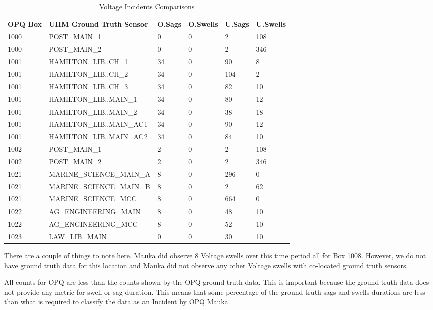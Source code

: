 \begin{table}[H]
    \centering
    \caption{Voltage Incidents Comparisons}
    \begin{tabularx}{\textwidth}{lXllll}
        \toprule
        \textbf{OPQ Box} & \textbf{UHM Ground Truth Sensor} & \textbf{O.Sags} & \textbf{O.Swells} & \textbf{U.Sags} & \textbf{U.Swells} \\
        \midrule
        1000 & POST\_MAIN\_1 & 0 & 0 & 2 & 108 \\
        1000 & POST\_MAIN\_2 & 0 & 0 & 2 & 346 \\
        1001 & HAMILTON\_LIB..CH\_1 & 34 & 0 & 90 & 8 \\
        1001 & HAMILTON\_LIB..CH\_2 & 34 & 0 & 104 & 2 \\
        1001 & HAMILTON\_LIB..CH\_3 & 34 & 0 & 82 & 10 \\
        1001 & HAMILTON\_LIB..MAIN\_1 & 34 & 0 & 80 & 12 \\
        1001 & HAMILTON\_LIB..MAIN\_2 & 34 & 0 & 38 & 18 \\
        1001 & HAMILTON\_LIB..MAIN\_AC1 & 34 & 0 & 90 & 12\\
        1001 & HAMILTON\_LIB..MAIN\_AC2 & 34 & 0 & 84 & 10\\
        1002 & POST\_MAIN\_1 & 2 & 0 & 2 & 108 \\
        1002 & POST\_MAIN\_2 & 2 & 0 & 2 & 346 \\
        1021 & MARINE\_SCIENCE\_MAIN\_A & 8 & 0 & 296 & 0 \\
        1021 & MARINE\_SCIENCE\_MAIN\_B & 8 & 0 & 2 & 62 \\
        1021 & MARINE\_SCIENCE\_MCC & 8 & 0 & 664 & 0 \\
        1022 & AG\_ENGINEERING\_MAIN & 8 & 0 & 48 & 10 \\
        1022 & AG\_ENGINEERING\_MCC & 8 & 0 & 52 & 10 \\
        1023 & LAW\_LIB\_MAIN & 0 & 0 & 30 & 10 \\
        \bottomrule
    \end{tabularx}
    \label{table:gt_v_incidents}
\end{table}

There are a couple of things to note here. Mauka did observe 8 Voltage swells over this time period all for Box 1008. However, we do not have ground truth data for this location and Mauka did not observe any other Voltage swells with co-located ground truth sensors.

All counts for OPQ are less than the counts shown by the OPQ ground truth data. This is important because the ground truth data does not provide any metric for swell or sag duration. This means that some percentage of the ground truth sags and swells durations are less than what is required to classify the data as an Incident by OPQ Mauka.

